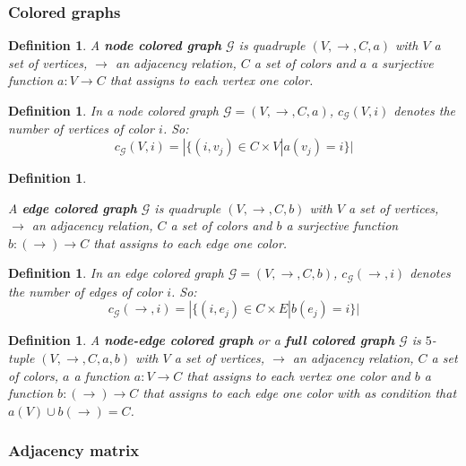 \documentclass[a4paper,11pt]{report}
\newtheorem{definition}[theorem]{Definition}
\newcommand{\graf}{\mathscr{G}}
\begin{document}
 \subsubsection{Colored graphs}\label{colored}
 \begin{definition}\label{defcolor}
   A \textbf{node colored graph} $\graf$ is quadruple  $(V, \to, C, a)$ with $V$ 
   a set of vertices, $\to$ an adjacency relation, $C$ a set of colors and $a$ 
   a surjective function $a: V \to C$ that assigns to each vertex one color.
 \end{definition}
 \begin{definition}
   In a node colored graph $\graf = (V, \to, C, a) $, $c_\graf(V,i)$ denotes the number of vertices of 
   color $i$. So:
   $$c_\graf(V, i) = |\{(i, v_j) \in C \times V | a(v_j) = i\}|$$
 \end{definition}
 \begin{definition}\label{edgecolored}

   A \textbf{edge colored graph} $\graf$ is quadruple  $(V, \to, C, b)$ with $V$ 
   a set of vertices, $\to$ an adjacency relation, $C$ a set of colors and $b$ 
   a surjective function $b: (\to) \to C$ that assigns to each edge one color.
 \end{definition}
 \begin{definition}
   In an edge colored graph $\graf = (V, \to, C, b) $, $c_\graf(\to,i)$ denotes the number of edges of 
   color $i$. So:
   $$c_\graf(\to, i) = |\{(i, e_j) \in C \times E | b(e_j) = i\}|$$
 \end{definition}
  \begin{definition}\label{fullcolored}
   A \textbf{node-edge colored graph} or a \textbf{full colored graph} $\graf$ is $5$-tuple  $(V, \to, C, a, b)$ with $V$ 
   a set of vertices, $\to$ an adjacency relation, $C$ a set of colors,  $a$ 
   a function $a: V \to C$ that assigns to each vertex one color and $b$ 
   a function $b: (\to) \to C$ that assigns to each edge one color with as 
   condition that $a(V) \cup b(\to) = C$.
 \end{definition}

 \subsubsection{Adjacency matrix}
\end{document}
